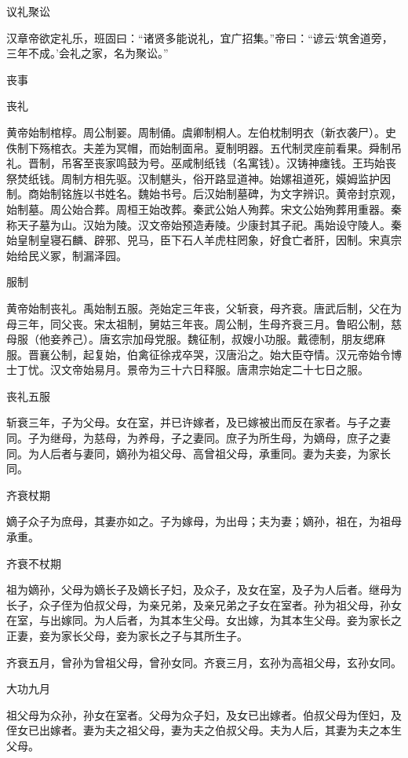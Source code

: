 \documentclass[a4paper,12pt,UTF8,twoside]{ctexbook}
\begin{document}
    议礼聚讼
    
    汉章帝欲定礼乐，班固曰：“诸贤多能说礼，宜广招集。”帝曰：“谚云‘筑舍道旁，三年不成。’会礼之家，名为聚讼。”
    
    丧事
    
    丧礼
    
    黄帝始制棺椁。周公制翣。周制俑。虞卿制桐人。左伯枕制明衣（新衣袭尸）。史佚制下殇棺衣。夫差为冥帽，而始制面帛。夏制明器。五代制灵座前看果。舜制吊礼。晋制，吊客至丧家鸣鼓为号。巫咸制纸钱（名寓钱）。汉铸神瘗钱。王玙始丧祭焚纸钱。周制方相先驱。汉制魌头，俗开路显道神。始嫘祖道死，嫫姆监护因制。商始制铭旌以书姓名。魏始书号。后汉始制墓碑，为文字辨识。黄帝封京观，始制墓。周公始合葬。周桓王始改葬。秦武公始人殉葬。宋文公始殉葬用重器。秦称天子墓为山。汉始为陵。汉文帝始预造寿陵。少康封其子祀。禹始设守陵人。秦始皇制皇寝石麟、辟邪、兕马，臣下石人羊虎柱罔象，好食亡者肝，因制。宋真宗始给民义冢，制漏泽园。
    
    服制
    
    黄帝始制丧礼。禹始制五服。尧始定三年丧，父斩衰，母齐衰。唐武后制，父在为母三年，同父丧。宋太祖制，舅姑三年丧。周公制，生母齐衰三月。鲁昭公制，慈母服（他妾养己）。唐玄宗加母党服。魏征制，叔嫂小功服。戴德制，朋友缌麻服。晋襄公制，起复始，伯禽征徐戎卒哭，汉唐沿之。始大臣夺情。汉元帝始令博士丁忧。汉文帝始易月。景帝为三十六日释服。唐肃宗始定二十七日之服。
    
    丧礼五服
    
    斩衰三年，子为父母。女在室，并已许嫁者，及已嫁被出而反在家者。与子之妻同。子为继母，为慈母，为养母，子之妻同。庶子为所生母，为嫡母，庶子之妻同。为人后者与妻同，嫡孙为祖父母、高曾祖父母，承重同。妻为夫妾，为家长同。
    
    齐衰杖期
    
    嫡子众子为庶母，其妻亦如之。子为嫁母，为出母；夫为妻；嫡孙，祖在，为祖母承重。
    
    齐衰不杖期
    
    祖为嫡孙，父母为嫡长子及嫡长子妇，及众子，及女在室，及子为人后者。继母为长子，众子侄为伯叔父母，为亲兄弟，及亲兄弟之子女在室者。孙为祖父母，孙女在室，与出嫁同。为人后者，为其本生父母。女出嫁，为其本生父母。妾为家长之正妻，妾为家长父母，妾为家长之子与其所生子。
    
    齐衰五月，曾孙为曾祖父母，曾孙女同。齐衰三月，玄孙为高祖父母，玄孙女同。
    
    大功九月
    
    祖父母为众孙，孙女在室者。父母为众子妇，及女已出嫁者。伯叔父母为侄妇，及侄女已出嫁者。妻为夫之祖父母，妻为夫之伯叔父母。夫为人后，其妻为夫之本生父母。
    
\end{document}
